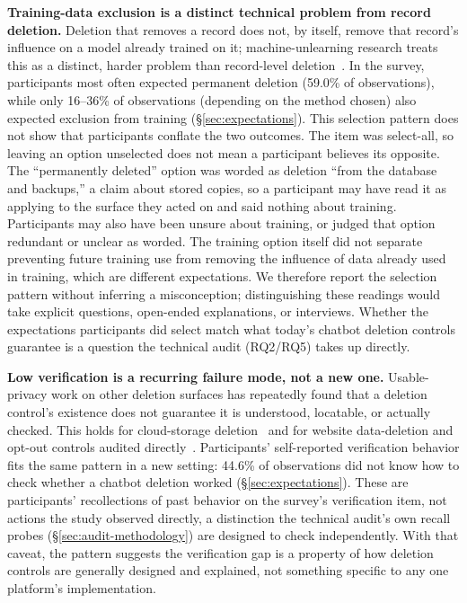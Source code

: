 \documentclass[conference,compsoc]{IEEEtran}
\begin{document}
\textbf{Training-data exclusion is a distinct technical problem from record
deletion.} Deletion that removes a record does not, by itself, remove
that record's influence on a model already trained on it; machine-unlearning
research treats this as a distinct, harder problem than record-level
deletion~\cite{bourtoule2021machine}. In the survey, participants most
often expected permanent deletion (59.0\% of observations), while only
16--36\% of observations (depending on the method chosen) also expected
exclusion from training (\S\ref{sec:expectations}). This selection pattern does not show that
participants conflate the two outcomes. The item was select-all, so leaving an
option unselected does not mean a participant believes its opposite. The
``permanently deleted'' option was worded as deletion ``from the database and
backups,'' a claim about stored copies, so a participant may have read it as
applying to the surface they acted on and said nothing about training.
Participants may also have been unsure about training, or judged that option
redundant or unclear as worded. The training option itself did not separate
preventing future training use from removing the influence of data already
used in training, which are different expectations. We therefore report the
selection pattern without inferring a misconception; distinguishing these
readings would take explicit questions, open-ended explanations, or
interviews. Whether the expectations participants did select match what
today's chatbot deletion controls guarantee is a question the technical
audit (RQ2/RQ5) takes up directly.

\textbf{Low verification is a recurring failure mode, not a new one.}
Usable-privacy work on other deletion surfaces has repeatedly found that
a deletion control's existence does not guarantee it is understood,
locatable, or actually checked. This holds for cloud-storage
deletion~\cite{ramokapane2017stupid} and for website data-deletion and
opt-out controls audited directly~\cite{habib2019empirical}.
Participants' self-reported verification behavior fits the same pattern
in a new setting: 44.6\% of observations did not know how
to check whether a chatbot deletion worked (\S\ref{sec:expectations}). These are participants' recollections of
past behavior on the survey's verification item, not actions the study
observed directly, a distinction the technical audit's own recall probes
(\S\ref{sec:audit-methodology}) are designed to check independently. With
that caveat, the pattern suggests the verification gap is a property of
how deletion controls are generally designed and explained, not something
specific to any one platform's implementation.
\end{document}
